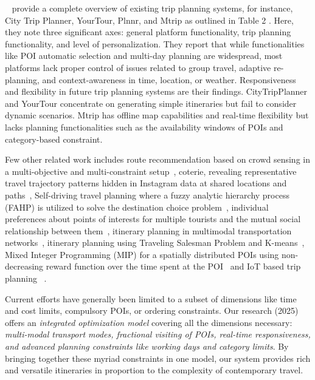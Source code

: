 ~\cite{sylejmani2011survey} provide a complete overview of existing trip planning systems, for instance, City Trip Planner, YourTour, Plnnr, and Mtrip as outlined in Table 2 . Here, they note three significant axes: general platform functionality, trip planning functionality, and level of personalization. They report that while functionalities like POI automatic selection and multi-day planning are widespread, most platforms lack proper control of issues related to group travel, adaptive re-planning, and context-awareness in time, location, or weather. Responsiveness and flexibility in future trip planning systems are their findings. CityTripPlanner and YourTour concentrate on generating simple itineraries but fail to consider dynamic scenarios. Mtrip has offline map capabilities and real-time flexibility but lacks planning functionalities such as the availability windows of POIs and category-based constraint.

Few other related work includes route recommendation based on crowd sensing in a multi-objective and multi-constraint setup~\cite{zheng2021novel}, coterie, revealing representative travel trajectory patterns hidden in Instagram data at shared locations and paths~\cite{yu2017mining}, Self-driving travel planning where a fuzzy analytic hierarchy process (FAHP) is utilized to solve the destination choice problem~\cite{jiaoman2018travel}, individual preferences about points of interests for multiple tourists and the mutual social relationship between them~\cite{sylejmani2017planning}, itinerary planning in multimodal transportation networks~\cite{zografos2008algorithms}, itinerary planning using Traveling Salesman Problem and K-means~\cite{rani2018development}, Mixed Integer Programming (MIP) for a spatially distributed POIs using non-decreasing reward function over the time spent at the POI~\cite{yu2014optimal} and IoT based trip planning ~\cite{arora2024itinerary}.   

Current efforts have generally been limited to a subset of dimensions like time and cost limits, compulsory POIs, or ordering constraints. Our research (2025) offers an \emph{integrated optimization model} covering all the dimensions necessary: \emph{multi-modal transport modes, fractional visiting of POIs, real-time responsiveness, and advanced planning constraints like working days and category limits}. By bringing together these myriad constraints in one model, our system provides rich and versatile itineraries in proportion to the complexity of contemporary travel.

